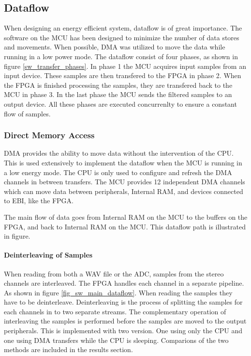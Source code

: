 
\subsection{Dataflow}
\newpage
When designing an energy efficient system, dataflow is of great importance. The
software on the MCU has been designed to minimize the number of data stores and
movements. When possible, DMA was utilized to move the data while running in a
low power mode. The dataflow consist of four phases, as shown in figure \ref{sw_transfer_phases}. 
In phase 1 the MCU acquires input samples from an input device. These samples are 
then transfered to the FPGA in phase 2. When the FPGA is finished processing the
samples, they are transfered back to the MCU in phase 3. In the last phase the MCU
sends the filtered samples to an output device. All these phases are executed 
concurrenlty to ensure a constant flow of samples. 



\subsubsection{Direct Memory Access} DMA provides the ability to move data
without the intervention of the CPU. This is used extensively to implement the
dataflow when the MCU is running in a low energy mode. The CPU is only used to configure
and refresh the DMA channels in between transfers. The MCU provides 12
independent DMA channels which can move data between peripherals, Internal RAM, and
devices connected to EBI, like the FPGA.

The main flow of data goes from Internal RAM on the MCU to the buffers on
the FPGA, and back to Internal RAM on the MCU. This dataflow path is illustrated in figure.

% 

\paragraph{Deinterleaving of Samples}
When reading from both a WAV file or the ADC, samples from the stereo channels
are interleaved. The FPGA handles each channel in a separate pipeline. As shown 
in figure \ref{fig_sw_main_dataflow}. 
When reading the samples they have to be deinterleave. Deinterleaving is the
process of splitting the samples for each channels in to two separate streams. 
The complementary operation of interleaving the samples is performed before the samples 
are moved to the output peripherals.
This is implemented with two version. One using only the CPU and one using DMA transfers
while the CPU is sleeping. Comparions of the two methods are included in the results section.

